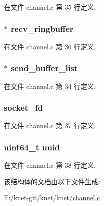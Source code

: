在文件 channel.\+c 第 35 行定义.

\hypertarget{struct__channel__t_ab42a82a086d2d4d5946e5af77d95bd52}{}
\subsubsection[{recv\+\_\+ringbuffer}]{$\ast$ recv\+\_\+ringbuffer}\label{struct__channel__t_ab42a82a086d2d4d5946e5af77d95bd52}


在文件 channel.\+c 第 36 行定义.

\hypertarget{struct__channel__t_a92dac2c6eec6322971fd3b842107a7a8}{}
\subsubsection[{send\+\_\+buffer\+\_\+list}]{$\ast$ send\+\_\+buffer\+\_\+list}\label{struct__channel__t_a92dac2c6eec6322971fd3b842107a7a8}


在文件 channel.\+c 第 34 行定义.

\hypertarget{struct__channel__t_ae1421d1046e5f40613ebe58da2b170e9}{}
\subsubsection[{socket\+\_\+fd}]{ socket\+\_\+fd}\label{struct__channel__t_ae1421d1046e5f40613ebe58da2b170e9}


在文件 channel.\+c 第 37 行定义.

\hypertarget{struct__channel__t_a39dd6627d886e64fade4f193f5839759}{}
\subsubsection[{uuid}]{\setlength{\rightskip}{0pt plus 5cm}uint64\+\_\+t uuid}\label{struct__channel__t_a39dd6627d886e64fade4f193f5839759}


在文件 channel.\+c 第 38 行定义.



该结构体的文档由以下文件生成\+:\begin{DoxyCompactItemize}
\item 
E\+:/knet-\/git/knet/knet/\hyperlink{channel_8c}{channel.\+c}\end{DoxyCompactItemize}
